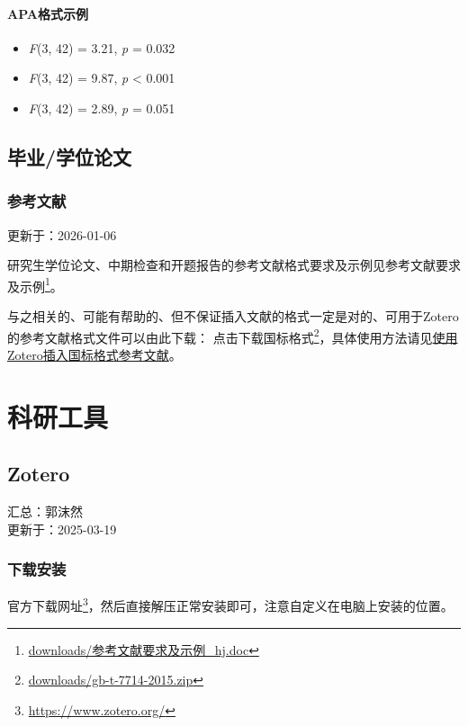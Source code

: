 \documentclass[]{ctexbook}
\providecommand{\tightlist}{%
  \setlength{\itemsep}{0pt}\setlength{\parskip}{0pt}}
\renewcommand{\href}[2]{#2\footnote{\url{#1}}}
\theoremstyle{definition}
\theoremstyle{definition}
\theoremstyle{definition}
\theoremstyle{definition}
\theoremstyle{remark}
\begin{document}
\subsection{APA格式示例}\label{apaux683cux5f0fux793aux4f8b}

\begin{itemize}
\tightlist
\item
  \emph{F}(3, 42) = 3.21, \emph{p} = 0.032
\item
  \emph{F}(3, 42) = 9.87, \emph{p} \textless{} 0.001
\item
  \emph{F}(3, 42) = 2.89, \emph{p} = 0.051
\end{itemize}

\chapter{毕业/学位论文}\label{thesis}

\section{参考文献}\label{thesisref}

更新于：2026-01-06

研究生学位论文、中期检查和开题报告的参考文献格式要求及示例见\href{downloads/参考文献要求及示例_hj.doc}{参考文献要求及示例}。

与之相关的、可能有帮助的、但不保证插入文献的格式一定是对的、可用于Zotero的参考文献格式文件可以由此下载：
\href{downloads/gb-t-7714-2015.zip}{点击下载国标格式}，具体使用方法请见\hyperref[zotero-cite-cn]{使用Zotero插入国标格式参考文献}。

\part{科研工具}\label{part-ux79d1ux7814ux5de5ux5177}

\chapter{Zotero}\label{zotero}

汇总：郭沫然\\
更新于：2025-03-19

\section{下载安装}\label{ux4e0bux8f7dux5b89ux88c5}

\href{https://www.zotero.org/}{官方下载网址}，然后直接解压正常安装即可，注意自定义在电脑上安装的位置。
\end{document}
